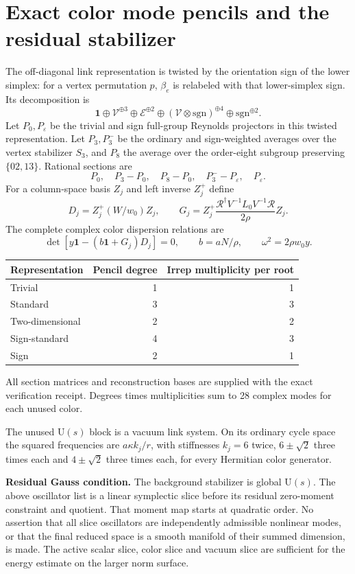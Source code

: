 \documentclass[11pt,a4paper]{article}
\newcommand{\id}{\mathbf1}\newcommand{\tr}{\operatorname{tr}}\newcommand{\diag}{\operatorname{diag}}\newcommand{\Rea}{\operatorname{Re}}
\begin{document}
\section{Exact color mode pencils and the residual stabilizer}
The off-diagonal link representation is twisted by the orientation sign of the lower simplex: for a vertex permutation $p$, $\beta_e$ is relabeled with that lower-simplex sign. Its decomposition is
\[
\mathbf1\oplus\mathcal V^{\oplus3}\oplus\mathcal E^{\oplus2}
\oplus(\mathcal V\otimes\mathrm{sgn})^{\oplus4}
\oplus\mathrm{sgn}^{\oplus2}.
\]
Let $P_0,P_\varepsilon$ be the trivial and sign full-group Reynolds projectors in this twisted representation. Let $P_3,P_3^-$ be the ordinary and sign-weighted averages over the vertex stabilizer $S_3$, and $P_8$ the average over the order-eight subgroup preserving $\{02,13\}$. Rational sections are
\[
P_0,\quad P_3-P_0,\quad P_8-P_0,\quad P_3^--P_\varepsilon,\quad P_\varepsilon.
\]
For a column-space basis $Z_j$ and left inverse $Z_j^+$ define
\[
D_j=Z_j^+(W/w_0)Z_j,\qquad
G_j=Z_j^+\frac{\mathcal R^\dagger V^{-1}L_0V^{-1}\mathcal R}{2\rho}Z_j.
\]
The complete complex color dispersion relations are
\[
\det[y\id-(b\id+G_j)D_j]=0,\qquad
b=aN/\rho,\qquad \omega^2=2\rho w_0y.
\]
\begin{center}
\begin{tabular}{lrr}
\toprule
Representation & Pencil degree & Irrep multiplicity per root\\
\midrule
Trivial & 1 & 1\\
Standard & 3 & 3\\
Two-dimensional & 2 & 2\\
Sign-standard & 4 & 3\\
Sign & 2 & 1\\
\bottomrule
\end{tabular}
\end{center}
All section matrices and reconstruction bases are supplied with the exact verification receipt. Degrees times multiplicities sum to 28 complex modes for each unused color.

The unused $\mathrm U(s)$ block is a vacuum link system. On its ordinary cycle space the squared frequencies are $a\kappa k_j/r$, with stiffnesses $k_j=6$ twice, $6\pm\sqrt2$ three times each and $4\pm\sqrt2$ three times each, for every Hermitian color generator.

\textbf{Residual Gauss condition.} The background stabilizer is global $\mathrm U(s)$. The above oscillator list is a linear symplectic slice before its residual zero-moment constraint and quotient. That moment map starts at quadratic order. No assertion that all slice oscillators are independently admissible nonlinear modes, or that the final reduced space is a smooth manifold of their summed dimension, is made. The active scalar slice, color slice and vacuum slice are sufficient for the energy estimate on the larger norm surface.
\end{document}
